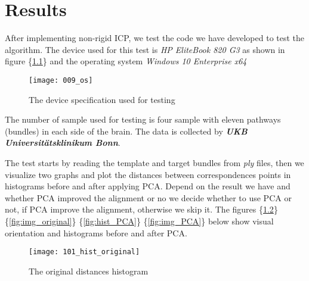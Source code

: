 \documentclass[../structure.tex]{subfiles}
\begin{document}
\chapter{Results}
\hspace{2em}After implementing non-rigid ICP, we test the code we have developed to test the algorithm. The device used for this test is \textit{HP EliteBook 820 G3} as shown in figure \{\ref{fig:OS}\} and the operating system \textit{Windows 10 Enterprise x64} 
\\
\begin{figure}[h!]
\centering
\texttt{[image: 009\_os]}
\captionsetup{justification=centering}
\caption{The device specification used for testing}
\label{fig:OS}
\end{figure}

The number of sample used for testing is four sample with eleven pathways (bundles) in each side of the brain. The data is collected by \textbf{\textit{UKB Universitätsklinikum Bonn}}. 
\begin{comment}
\begin{center}
\begin{table}[h!]
	\begin{tabular}{| c | c | c | c | c | c | c | c |}
	\hline
	1 & 2 & 3 & 4 & 5 & 6 & 7 & 8\\
	\hline
	(x,y,z) & (x,y,-z) & (x,-y,z) & (x,-y,-z) & (-x,-y,z) & (-x,y,-z) & (-x,y,z) & (-x,-y,-z)\\
	\hline
	\end{tabular}
\caption{$[-1,1]^3$ cube combination}
\label{table:cube}
\end{table}
\end{center}
\end{comment}

The test starts by reading the template and target bundles from \textit{ply} files, then we visualize two graphs and plot the distances between correspondences points in histograms before and after applying PCA. Depend on the result we have and whether PCA improved the alignment or no we decide whether to use PCA or not, if PCA improve the alignment, otherwise we skip it. The figures \{\ref{fig:hist_original}\} \{\ref{fig:img_original}\} \{\ref{fig:hist_PCA}\} \{\ref{fig:img_PCA}\} below show visual orientation and histograms before and after PCA.

\pagebreak

\begin{figure}[h!]
\centering
\texttt{[image: 101\_hist\_original]}
\captionsetup{justification=centering}
\caption{The original distances histogram}
\label{fig:hist_original}
\end{figure}
\end{document}
